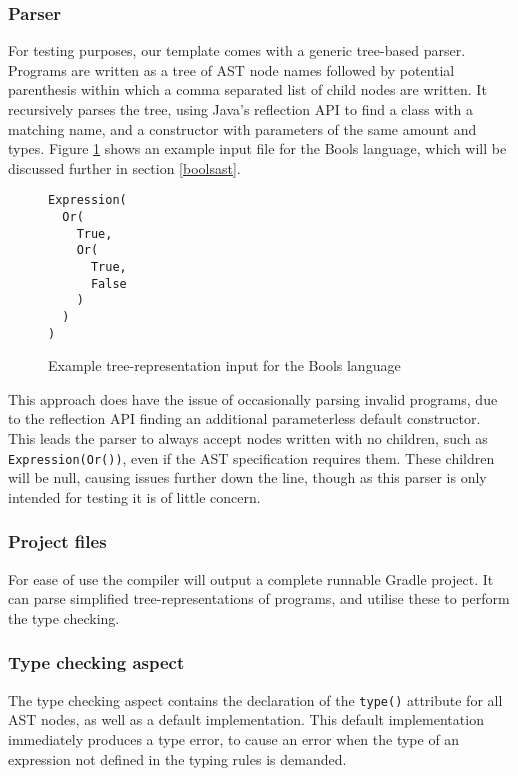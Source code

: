 \documentclass[nofilelist]{cslthse-msc}
\begin{document}
\subsubsection{Parser}\label{treebasedparser}
For testing purposes, our template comes with a generic tree-based parser.
Programs are written as a tree of AST node names followed by potential parenthesis within which a comma separated list of child nodes are written.
It recursively parses the tree, using Java's reflection API to find a class with a matching name, and a constructor with parameters of the same amount and types.
Figure \ref{boolinputexample} shows an example input file for the Bools language, which will be discussed further in section \ref{boolsast}.

\begin{figure}[h]
\begin{lstlisting}[]
Expression(
  Or(
    True,
    Or(
      True,
      False
    )
  )
)
\end{lstlisting}
  \caption{Example tree-representation input for the Bools language}
  \label{boolinputexample}
\end{figure}

This approach does have the issue of occasionally parsing invalid programs, due to the reflection API finding an additional parameterless default constructor.
This leads the parser to always accept nodes written with no children, such as \lstinline{Expression(Or())}, even if the AST specification requires them.
These children will be null, causing issues further down the line, though as this parser is only intended for testing it is of little concern.

\subsubsection{Project files}\label{projectfiles}
For ease of use the compiler will output a complete runnable Gradle project.
It can parse simplified tree-representations of programs, and utilise these to perform the type checking.

\subsubsection{Type checking aspect}\label{typecheckingaspect}
The type checking aspect contains the declaration of the \lstinline{type()} attribute for all AST nodes, as well as a default implementation.
This default implementation immediately produces a type error, to cause an error when the type of an expression not defined in the typing rules is demanded.
\end{document}
